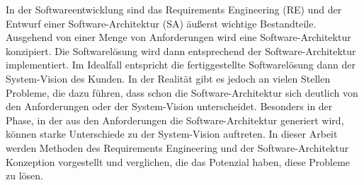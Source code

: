 In der Softwareentwicklung sind das Requirements Engineering (RE) und der Entwurf einer Software-Architektur (SA) \"au\ss{}erst wichtige Bestandteile. Ausgehend von einer Menge von Anforderungen wird eine Software-Architektur konzipiert. Die Softwarel\"osung wird dann entsprechend der Software-Architektur implementiert. Im Idealfall entspricht die fertiggestellte Softwarel\"osung dann der System-Vision des Kunden. In der Realit\"at gibt es jedoch an vielen Stellen Probleme, die dazu f\"uhren, dass schon die Software-Architektur sich deutlich von den Anforderungen oder der System-Vision unterscheidet. Besonders in der Phase, in der aus den Anforderungen die Software-Architektur generiert wird, k\"onnen starke Unterschiede zu der System-Vision auftreten. In dieser Arbeit werden Methoden des Requirements Engineering und der Software-Architektur Konzeption vorgestellt und verglichen, die das Potenzial haben, diese Probleme zu l\"osen.